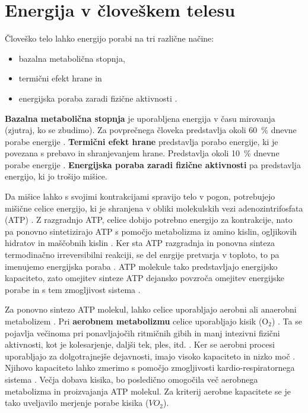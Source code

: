 \section{Energija v človeškem telesu}\label{sec:energija}
Človeško telo lahko energijo porabi na tri različne načine:

\begin{itemize}
\item bazalna metabolična stopnja,
\item termični efekt hrane in
\item energijska poraba zaradi fizične aktivnosti \cite{levine2005measurement}.
\end{itemize}

\textbf{Bazalna metabolična stopnja} je uporabljena energija v času mirovanja (zjutraj, ko se zbudimo). Za povprečnega človeka predstavlja okoli \SI{60}{\%} dnevne porabe energije \cite{levine2005measurement}. \textbf{Termični efekt hrane} predstavlja porabo energije, ki je povezana s prebavo in shranjevanjem hrane. Predstavlja okoli \SI{10}{\%} dnevne porabe energije \cite{levine2005measurement}. \textbf{Energijska poraba zaradi fizične aktivnosti} pa predstavlja energijo, ki jo trošijo mišice. 

Da mišice lahko s svojimi kontrakcijami spravijo telo v pogon, potrebujejo mišične celice energijo, ki je shranjena v obliki molekulskih vezi adenozintrifosfata (ATP) \cite{scott2005misconceptions}. Z razgradnjo ATP, celice dobijo potrebno energijo za kontrakcije, nato pa ponovno sintetizirajo ATP s pomočjo metabolizma iz amino kislin, ogljikovih hidratov in maščobnih kislin \cite{scott2005misconceptions,patel2017aerobic}. Ker sta ATP razgradnja in ponovna sinteza termodinačno irreversibilni reakciji, se del enrgije pretvarja v toploto, to pa imenujemo energijska poraba \cite{scott2005misconceptions}. ATP molekule tako predstavljajo energijsko kapaciteto, zato omejitev sinteze ATP dejansko povzroča omejitev energijske porabe in s tem zmogljivost sistema \cite{sahlin1998energy}. 

Za ponovno sintezo ATP molekul, lahko celice uporabljajo aerobni ali anaerobni metabolizem \cite{scott2005misconceptions}. Pri \textbf{aerobnem metabolizmu} celice uporabljajo kisik ($\mathrm{O}_2$) \cite{patel2017aerobic}. Ta se pojavlja večinoma pri ponavljajočih ritmičnih gibih in manj intezivni fizični aktivnosti, kot je kolesarjenje, daljši tek, ples, itd. \cite{patel2017aerobic}. Ker se aerobni procesi uporabljajo za dolgotrajnejše dejavnosti, imajo visoko kapaciteto in nizko moč \cite{sahlin1998energy}. Njihovo kapaciteto lahko zmerimo s pomočjo zmogljivosti kardio-respiratornega sistema \cite{patel2017aerobic}. Večja dobava kisika, bo posledično omogočila več aerobnega metabolizma in proizvajanja ATP molekul. Za kriterij aerobne kapacitete se je tako uveljavilo merjenje porabe kisika (${VO}_2$).


